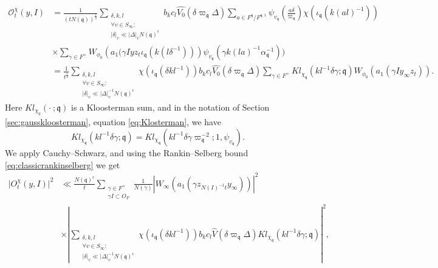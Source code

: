 \documentclass[a4paper,11pt]{amsart}
\theoremstyle{definition}
\begin{document}
\begin{align*}
      \mathcal{O}^{\chi}_t(y,I) &= \frac{1}{(tN(\mathfrak{q}))^{\frac{1}{2}}}\sum_{\substack{\delta,k,l\\ \forall v \in S_{\infty}:\\\vert{\delta}\vert_v \ll \vert{\Delta}\vert_vN(\mathfrak{q})^{\epsilon}}}b_kc_l\widehat{V_0}\left(\delta\varpi_\mathfrak{q}\Delta\right)\sum_{a\in F^{\mathfrak{q}}/F^{\mathfrak{q,1}}}\psi_{v_{\mathfrak{q}}}\left(\frac{a\delta}{\varpi_{\mathfrak{q}}}\right)\chi(\iota_{\mathfrak{q}}(k(al)^{-1}))\nonumber\\
    &\times \sum_{\gamma \in F^{\times}}W_{\phi_0}\left(a_1(\gamma Iyz_t\iota_{\mathfrak{q}}(k(l\delta^{-1}))\right)\psi_{v_{\mathfrak{q}}}(\gamma k(la)^{-1}\alpha_{\mathfrak{q}}^{-1})) \\ &= \frac{1}{t^{\frac{1}{2}}}\sum_{\substack{\delta,k,l\\ \forall v \in S_{\infty}:\\\vert{\delta}\vert_v \ll \vert{\Delta}\vert_v^{-1}N(\mathfrak{q})^{\epsilon}}}\chi(\iota_{\mathfrak{q}}(\delta kl^{-1}))b_kc_l\widehat{V_0}\left(\delta\varpi_\mathfrak{q}\Delta\right) \sum_{\gamma \in F^{\times}}Kl_{\chi_{\mathfrak{q}}}(kl^{-1}\delta\gamma;\mathfrak{q})W_{\phi_0}\left(a_1(\gamma Iy_{\infty}z_t)\right).
\end{align*} Here $Kl_{\chi_{q}}(\cdot\ ;\mathfrak{q})$ is a Kloosterman sum, and in the notation of Section \ref{sec:gausskloosterman}, equation \eqref{eq:Klosterman}, we have
\[Kl_{\chi_{\mathfrak{q}}}(kl^{-1}\delta \gamma;\mathfrak{q})= Kl_{\chi_{\mathfrak{q}}}(kl^{-1}\delta\gamma\varpi_{\mathfrak{q}}^{-2};1,\psi_{v_{\mathfrak{q}}}).\]
We apply Cauchy--Schwarz, and using the Rankin--Selberg bound \eqref{eq:classicrankinselberg} we get 
\begin{align*}
    \vert{O_t^{\chi}(y,I)}\vert^2 &\ll \frac{N(\mathfrak{q})^{\epsilon}}{t} \sum_{\substack{\gamma \in F^{\times}\\ \gamma I \subset O_F  }}\frac{1}{N(\gamma)}\left\vert W_{\infty}(a_1(\gamma z_{N(I)^{-1}t}y_\infty))\right\vert^2\\&\times\left\vert \sum_{\substack{\delta,k,l\\ \forall v \in S_{\infty}:\\\vert{\delta}\vert_v \ll \vert{\Delta}\vert_v^{-1}N(\mathfrak{q})^{\epsilon}}}\chi(\iota_{\mathfrak{q}}(\delta kl^{-1}))b_kc_l\widehat{V}\left(\delta\varpi_\mathfrak{q}\Delta\right)Kl_{\chi_{\mathfrak{q}}}(kl^{-1}\delta\gamma;\mathfrak{q})\right\vert^2,
\end{align*}
\end{document}
